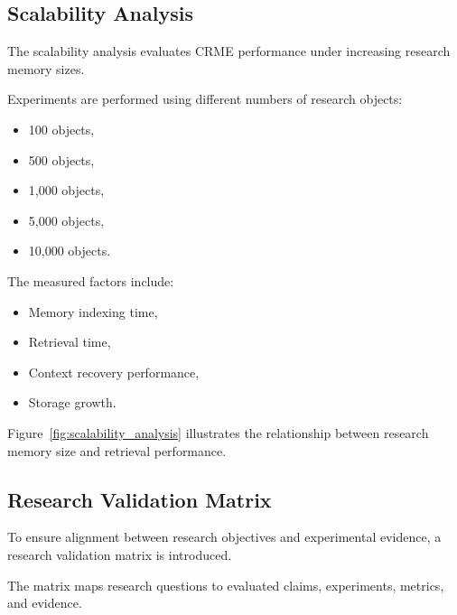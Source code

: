\subsection{Scalability Analysis}

The scalability analysis evaluates CRME performance under increasing research memory sizes.

Experiments are performed using different numbers of research objects:

\begin{itemize}
\item 100 objects,
\item 500 objects,
\item 1,000 objects,
\item 5,000 objects,
\item 10,000 objects.
\end{itemize}


The measured factors include:

\begin{itemize}
\item Memory indexing time,
\item Retrieval time,
\item Context recovery performance,
\item Storage growth.
\end{itemize}


Figure~\ref{fig:scalability_analysis} illustrates the relationship between research memory size and retrieval performance.



\subsection{Research Validation Matrix}

To ensure alignment between research objectives and experimental evidence, a research validation matrix is introduced.

The matrix maps research questions to evaluated claims, experiments, metrics, and evidence.


